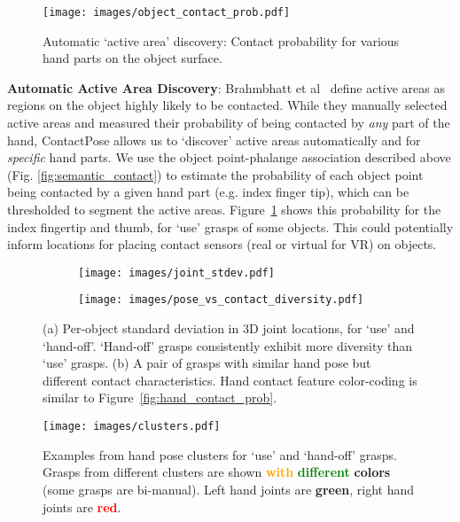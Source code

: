 \documentclass[runningheads]{llncs}
\begin{document}
\begin{figure}
  \texttt{[image: images/object\_contact\_prob.pdf]}
  \caption{Automatic `active area' discovery: Contact probability for various hand parts on the object surface.}
  \label{fig:active_areas}
\end{figure}

\noindent\textbf{Automatic Active Area Discovery}: Brahmbhatt et al~\cite{contactdbv1} define active areas as regions on the object highly likely to be contacted. While they manually selected active areas and measured their probability of being contacted by \emph{any} part of the hand, ContactPose allows us to `discover' active areas automatically and for \emph{specific} hand parts. We use the object point-phalange association described above (\eg Fig. \ref{fig:semantic_contact}) to estimate the probability of each object point being contacted by a given hand part (e.g. index finger tip), which can be thresholded to segment the active areas. Figure~\ref{fig:active_areas} shows this probability for the index fingertip and thumb, for `use' grasps of some objects. This could potentially inform locations for placing contact sensors (real \cite{Pham2018HandObjectCF} or virtual for VR) on objects. 

\begin{figure*}
\begin{subfigure}{.61\textwidth}
	\texttt{[image: images/joint\_stdev.pdf]}
	\caption{}
	\label{fig:joint_stdev}
\end{subfigure}
\hfill
\begin{subfigure}{.36\textwidth}
	\texttt{[image: images/pose\_vs\_contact\_diversity.pdf]}
	\caption{}
	\label{fig:pose_vs_contact_diversity}
\end{subfigure}
\caption{(a) Per-object standard deviation in 3D joint locations, for `use' and `hand-off'. `Hand-off' grasps consistently exhibit more diversity than `use' grasps. (b) A pair of grasps with similar hand pose but different contact characteristics. Hand contact feature color-coding is similar to Figure~\ref{fig:hand_contact_prob}.}
\end{figure*}

\begin{figure}
  \texttt{[image: images/clusters.pdf]}
  \caption{Examples from hand pose clusters for `use' and `hand-off' grasps. Grasps from different clusters are shown \textbf{\textcolor{Orange}{with}} \textbf{\textcolor{Green}{different}} \textbf{\textcolor{RoyalPurple}{colors}} (some grasps are bi-manual). Left hand joints are \textbf{\textcolor{OliveGreen}{green}}, right hand joints are \textbf{\textcolor{red}{red}}.}
  \label{fig:intra_object_clustering}
\end{figure}
\end{document}

